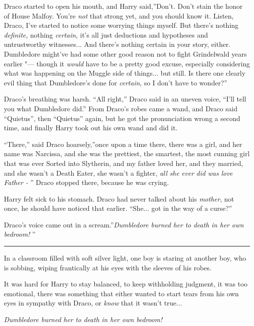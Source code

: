 Draco started to open his mouth, and Harry said,''Don't. Don't stain the
honor of House Malfoy. You're \emph{not} that strong yet, and you should
know it. Listen, Draco, I've started to notice some worrying things
myself. But there's nothing \emph{definite,} nothing \emph{certain,}
it's all just deductions and hypotheses and untrustworthy
witnesses... And there's nothing certain in your story, either.
Dumbledore might've had some other good reason not to fight Grindelwald
years earlier "--- though it \emph{would} have to be a pretty good excuse,
especially considering what was happening on the Muggle side of
things... but still. Is there one clearly evil thing that
Dumbledore's done for \emph{certain,} so I don't have to wonder?''

Draco's breathing was harsh. ``All right,'' Draco said in an uneven
voice, ``I'll tell you what Dumbledore did.'' From Draco's robes came a
wand, and Draco said ``Quietus'', then ``Quietus'' again, but he got the
pronunciation wrong a second time, and finally Harry took out his own
wand and did it.

``There,'' said Draco hoarsely,''once upon a time there, there was a
girl, and her name was Narcissa, and she was the prettiest, the
smartest, the most cunning girl that was ever Sorted into Slytherin, and
my father loved her, and they married, and she wasn't a Death Eater, she
wasn't a fighter, \emph{all she ever did was love Father -} '' Draco
stopped there, because he was crying.

Harry felt sick to his stomach. Draco had never talked about his
\emph{mother}, not once, he should have noticed that earlier.
``She... got in the way of a curse?''

Draco's voice came out in a scream.''\emph{Dumbledore burned her to
death in her own bedroom!} ''

\begin{center}\rule{3in}{0.4pt}\end{center}

In a classroom filled with soft silver light, one boy is staring at
another boy, who is sobbing, wiping frantically at his eyes with the
sleeves of his robes.

It was hard for Harry to stay balanced, to keep withholding judgment, it
was too emotional, there was something that either wanted to start tears
from his own eyes in sympathy with Draco, or \emph{know} that it wasn't
true...

\emph{Dumbledore burned her to death in her own bedroom!}

